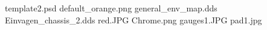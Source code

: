 template2.psd
default_orange.png
general_env_map.dds
Einvagen_chassis_2.dds
red.JPG
Chrome.png
gauges1.JPG
pad1.jpg
